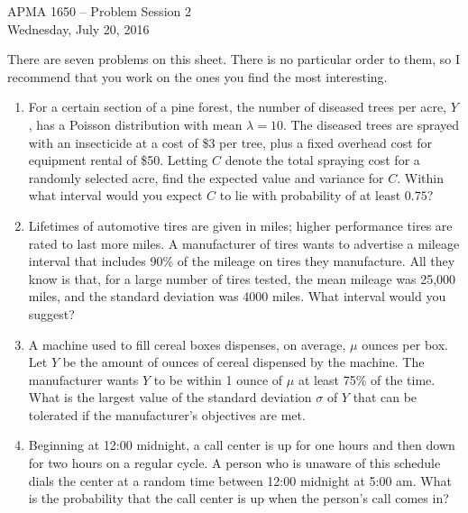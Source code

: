 \documentclass[12pt]{article}
\begin{document}
\title{}
\author{\vspace{-10ex} }

\begin{center}
{\LARGE APMA 1650 -- Problem Session 2}\\
\vspace{5mm}
{\large Wednesday, July 20, 2016}\\
\end{center}

There are seven problems on this sheet. There is no particular order to them, so I recommend that you work on the ones you find the most interesting.

\begin{enumerate}

\item For a certain section of a pine forest, the number of diseased trees per acre, $Y$ , has a Poisson distribution with mean $\lambda = 10$. The diseased trees are sprayed with an insecticide at a cost of \$3 per tree, plus a fixed overhead cost for equipment rental of \$50. Letting $C$ denote the total spraying cost for a randomly selected acre, find the expected value and variance for $C$. Within what interval would you expect $C$ to lie with probability of at least $0.75$?

\item Lifetimes of automotive tires are given in miles; higher performance tires are rated to last more miles. A manufacturer of tires wants to advertise a mileage interval that includes 90\% of the mileage on tires they manufacture. All they know is that, for a large number of tires tested, the mean mileage was 25,000 miles, and the standard deviation was 4000 miles. What interval would you suggest?

\item A machine used to fill cereal boxes dispenses, on average, $\mu$ ounces per box. Let $Y$ be the amount of ounces of cereal dispensed by the machine. The manufacturer wants $Y$ to be within 1 ounce of $\mu$ at least 75\% of the time. What is the largest value of the standard deviation $\sigma$ of $Y$ that can be tolerated if the manufacturer's objectives are met.

\item Beginning at 12:00 midnight, a call center is up for one hours and then down for two hours on a regular cycle. A person who is unaware of this schedule dials the center at a random time between 12:00 midnight at 5:00 am. What is the probability that the call center is up when the person's call comes in?


\end{enumerate}
\end{document}
